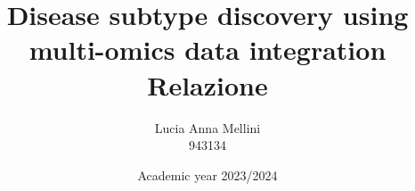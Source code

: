 \documentclass{report}
\begin{document}
\title{\huge{Disease subtype discovery using
multi-omics data integration}\\
\LARGE Relazione}
\author{Lucia Anna Mellini \\
 943134}
\date {Academic year 2023/2024}
\maketitle

\tableofcontents










\end{document}
